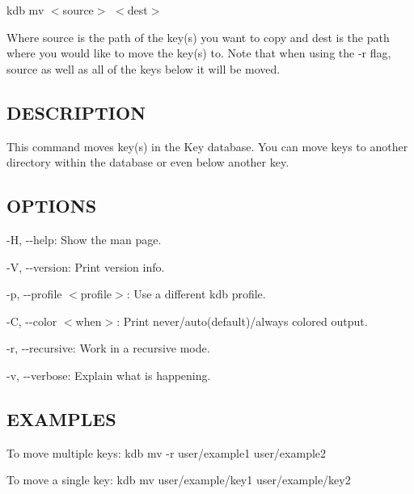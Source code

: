 {\ttfamily kdb mv $<$source$>$ $<$dest$>$}

Where {\ttfamily source} is the path of the key(s) you want to copy and {\ttfamily dest} is the path where you would like to move the key(s) to. Note that when using the {\ttfamily -\/r} flag, {\ttfamily source} as well as all of the keys below it will be moved.

\subsection*{D\+E\+S\+C\+R\+I\+P\+T\+I\+ON}

This command moves key(s) in the Key database. You can move keys to another directory within the database or even below another key.

\subsection*{O\+P\+T\+I\+O\+NS}


\begin{DoxyItemize}
\item {\ttfamily -\/H}, {\ttfamily -\/-\/help}\+: Show the man page.
\item {\ttfamily -\/V}, {\ttfamily -\/-\/version}\+: Print version info.
\item {\ttfamily -\/p}, {\ttfamily -\/-\/profile $<$profile$>$}\+: Use a different kdb profile.
\item {\ttfamily -\/C}, {\ttfamily -\/-\/color $<$when$>$}\+: Print never/auto(default)/always colored output.
\item {\ttfamily -\/r}, {\ttfamily -\/-\/recursive}\+: Work in a recursive mode.
\item {\ttfamily -\/v}, {\ttfamily -\/-\/verbose}\+: Explain what is happening.
\end{DoxyItemize}

\subsection*{E\+X\+A\+M\+P\+L\+ES}

To move multiple keys\+: {\ttfamily kdb mv -\/r user/example1 user/example2}

To move a single key\+: {\ttfamily kdb mv user/example/key1 user/example/key2} 